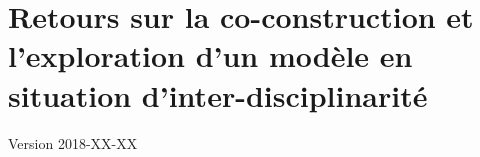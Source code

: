 \chapter{Retours sur la co-construction et l'exploration d'un modèle en situation d'inter-disciplinarité}
\begin{center}
	{\large Version 2018-XX-XX}
\end{center}
\minitoc

